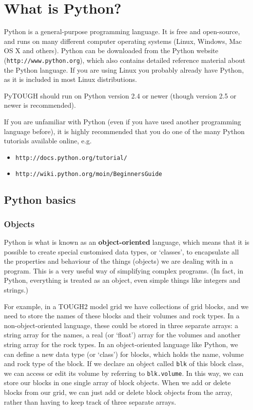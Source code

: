 \section{What is Python?}

Python is a general-purpose programming language.  It is free and open-source, and runs on many different computer operating systems (Linux, Windows, Mac OS X and others).  Python can be downloaded from the Python website (\texttt{http://www.python.org}), which also contains detailed reference material about the Python language.  If you are using Linux you probably already have Python, as it is included in most Linux distributions.

PyTOUGH should run on Python version 2.4 or newer (though version 2.5 or newer is recommended).

If you are unfamiliar with Python (even if you have used another programming language before), it is highly recommended that you do one of the many Python tutorials available online, e.g.

\begin{itemize}
  \item \texttt{http://docs.python.org/tutorial/}
  \item \texttt{http://wiki.python.org/moin/BeginnersGuide}
\end{itemize}

\subsection{Python basics}

\subsubsection{Objects}

Python is what is known as an \textbf{object-oriented} language, which means that it is possible to create special customised data types, or `classes', to encapsulate all the properties and behaviour of the things (objects) we are dealing with in a program.  This is a very useful way of simplifying complex programs.  (In fact, in Python, everything is treated as an object, even simple things like integers and strings.)

For example, in a TOUGH2 model grid we have collections of grid blocks, and we need to store the names of these blocks and their volumes and rock types.  In a non-object-oriented language, these could be stored in three separate arrays: a string array for the names, a real (or `float') array for the volumes and another string array for the rock types.  In an object-oriented language like Python, we can define a new data type (or `class') for blocks, which holds the name, volume and rock type of the block.  If we declare an object called \texttt{blk} of this block class, we can access or edit its volume by referring to \texttt{blk.volume}.  In this way, we can store our blocks in one single array of block objects.  When we add or delete blocks from our grid, we can just add or delete block objects from the array, rather than having to keep track of three separate arrays.

